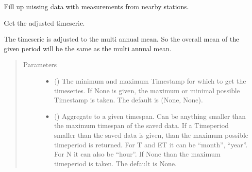 \documentclass[letterpaper,10pt,english]{sphinxmanual}
\begin{document}
\begin{fulllineitems}
\begin{fulllineitems}
\label{\detokenize{weatherDB:weatherDB.station.StationBase.fillup}}
\sphinxAtStartPar
Fill up missing data with measurements from nearby stations.

\end{fulllineitems}


\begin{fulllineitems}
\label{\detokenize{weatherDB:weatherDB.station.StationBase.get_adj}}
\sphinxAtStartPar
Get the adjusted timeserie.

\sphinxAtStartPar
The timeserie is adjusted to the multi annual mean.
So the overall mean of the given period will be the same as the multi annual mean.
\begin{quote}\begin{description}
\item[{Parameters}] \leavevmode\begin{itemize}
\item {} 
\sphinxAtStartPar
{} ({\hyperref[\detokenize{weatherDB.lib:weatherDB.lib.utils.TimestampPeriod}]{}}\sphinxstyleliteralemphasis{\sphinxupquote{(}}\sphinxstyleliteralemphasis{\sphinxupquote{)}}\sphinxstyleliteralemphasis{\sphinxupquote{, }}) \textendash{} The minimum and maximum Timestamp for which to get the timeseries.
If None is given, the maximum or minimal possible Timestamp is taken.
The default is (None, None).

\item {} 
\sphinxAtStartPar
{} (\sphinxstyleliteralemphasis{\sphinxupquote{, }}) \textendash{} Aggregate to a given timespan.
Can be anything smaller than the maximum timespan of the saved data.
If a Timeperiod smaller than the saved data is given, than the maximum possible timeperiod is returned.
For T and ET it can be “month”, “year”.
For N it can also be “hour”.
If None than the maximum timeperiod is taken.
The default is None.


\end{itemize}
\end{description}
\end{quote}
\end{fulllineitems}
\end{fulllineitems}
\end{document}

